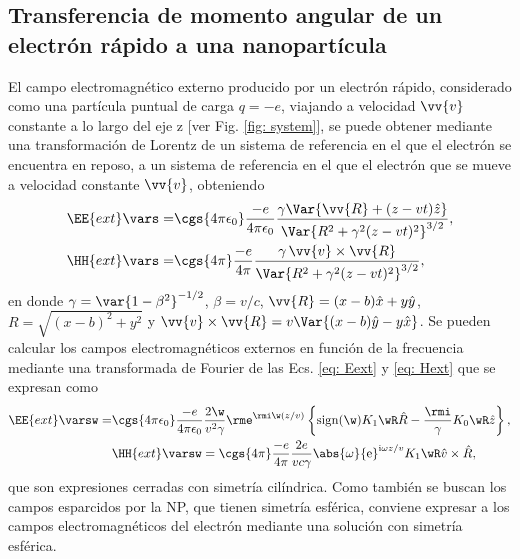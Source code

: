 \subsection{Transferencia de momento angular de un electrón rápido a una nanopartícula}
El campo electromagnético externo producido por un electrón rápido, considerado como una partícula puntual de carga $q=-e$, viajando a velocidad $\vv{v}$ constante a lo largo del eje z [ver Fig. \ref{fig: system}], se puede obtener mediante una transformación de Lorentz de un sistema de referencia en el que el electrón se encuentra en reposo, a un sistema de referencia en el que el electrón que se mueve a velocidad constante $\vv{v}$, obteniendo \cite{jackson}
\begin{align}
\EE{ext}\vars =& \cgs{4\pi\epsilon_0}\frac{-e}{4\pi\epsilon_0}\frac{\gamma \Var{\vv{R}+(z-vt)\hat{z}}}{\Var{R^2+\gamma^2(z-vt)^2}^{3/2}}, \label{eq: Eext}\\
\HH{ext}\vars =& \cgs{4\pi}\frac{-e}{4\pi}\frac{\gamma \, \vv{v}\times\vv{R}}{\Var{R^2+\gamma^2(z-vt)^2}^{3/2}}, \label{eq: Hext}
\end{align}
en donde $\gamma = \var{1-\beta^2}^{-1/2}$, $\beta = v/c$, $\vv{R}=(x-b)\hat{x}+y\hat{y}$, $R = \sqrt{(x-b)^2+y^2}$ y $\vv{v}\times\vv{R}=v\Var{(x-b)\hat{y}-y\hat{x}}$. Se pueden calcular los campos electromagnéticos externos en función de la frecuencia mediante una transformada de Fourier de las Ecs. \eqref{eq: Eext} y \eqref{eq: Hext} que se expresan como \cite{maciel2019electromagnetic}
\begin{align}
\EE{ext}\varsw = &\cgs{4\pi\epsilon_0}\frac{-e}{4\pi\epsilon_0}  \frac{2\w}{v^2 \gamma} \rme^{\rmi \w (z/v)} \left\{ {\rm sign}(\w) K_1\wR\hat{R} - \frac{\rmi}{\gamma}K_0\wR \hat{z}\right\},\\
&\HH{ext}\varsw = \cgs{4\pi}\frac{-e}{4\pi}\frac{2e}{v c \gamma} \abs{\omega} {\rm e}^{{\rm i}\omega z /v} K_1\wR \hat{v}\times\hat{R},
\end{align}
que son expresiones cerradas con simetría cilíndrica. Como también se buscan los campos esparcidos por la NP, que tienen simetría esférica, conviene expresar a los campos electromagnéticos del electrón mediante una solución con simetría esférica. 

